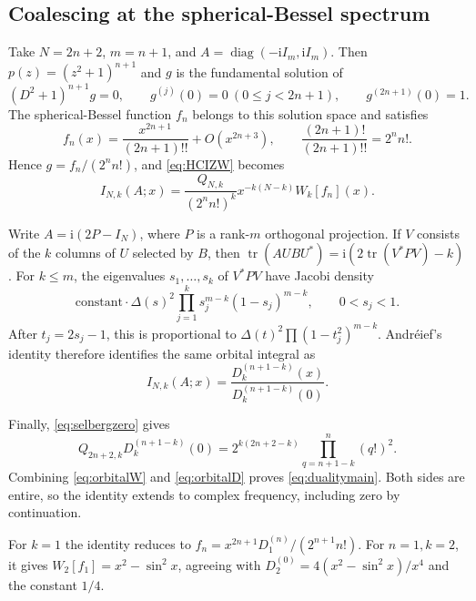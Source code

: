 \documentclass[11pt]{article}
\numberwithin{equation}{section}
\theoremstyle{remark}
\newcommand{\ii}{\mathrm{i}}
\DeclareMathOperator{\tr}{tr}
\DeclareMathOperator{\diag}{diag}
\begin{document}
\subsection{Coalescing at the spherical-Bessel spectrum}

Take $N=2n+2$, $m=n+1$, and $A=\diag(-\ii I_m,\ii I_m)$.
Then $p(z)=(z^2+1)^{n+1}$ and $g$ is the fundamental solution of
\[
 (D^2+1)^{n+1}g=0,\qquad
 g^{(j)}(0)=0\ (0\le j<2n+1),\qquad g^{(2n+1)}(0)=1.
\]
The spherical-Bessel function $f_n$ belongs to this solution space
and satisfies
\[
 f_n(x)=\frac{x^{2n+1}}{(2n+1)!!}+O(x^{2n+3}),\qquad
 \frac{(2n+1)!}{(2n+1)!!}=2^nn!.
\]
Hence $g=f_n/(2^nn!)$, and \eqref{eq:HCIZW} becomes
\begin{equation}\label{eq:orbitalW}
 I_{N,k}(A;x)=\frac{Q_{N,k}}{(2^nn!)^k}
                     x^{-k(N-k)}W_k[f_n](x).
\end{equation}

Write $A=\ii(2P-I_N)$, where $P$ is a rank-$m$ orthogonal projection.
If $V$ consists of the $k$ columns of $U$ selected by $B$, then
$\tr(AUBU^*)=\ii(2\tr(V^*PV)-k)$. For $k\le m$, the eigenvalues
$s_1,\ldots,s_k$ of $V^*PV$ have Jacobi density
\begin{equation}\label{eq:Jacobilaw}
 \text{constant}\cdot\Delta(s)^2
        \prod_{j=1}^ks_j^{m-k}(1-s_j)^{m-k},\qquad 0<s_j<1.
\end{equation}
After $t_j=2s_j-1$, this is proportional to
$\Delta(t)^2\prod(1-t_j^2)^{m-k}$. Andr\'eief's identity therefore
identifies the same orbital integral as
\begin{equation}\label{eq:orbitalD}
                  I_{N,k}(A;x)=\frac{D_k^{(n+1-k)}(x)}{D_k^{(n+1-k)}(0)}.
\end{equation}

Finally, \eqref{eq:selbergzero} gives
\[
 Q_{2n+2,k}D_k^{(n+1-k)}(0)
       =2^{k(2n+2-k)}\prod_{q=n+1-k}^{n}(q!)^2.
\]
Combining \eqref{eq:orbitalW} and \eqref{eq:orbitalD} proves
\eqref{eq:dualitymain}. Both sides are entire, so the identity extends
to complex frequency, including zero by continuation.

For $k=1$ the identity reduces to
$f_n=x^{2n+1}D_1^{(n)}/(2^{n+1}n!)$. For $n=1,k=2$, it gives
$W_2[f_1]=x^2-\sin^2x$, agreeing with
$D_2^{(0)}=4(x^2-\sin^2x)/x^4$ and the constant $1/4$.
\end{document}
